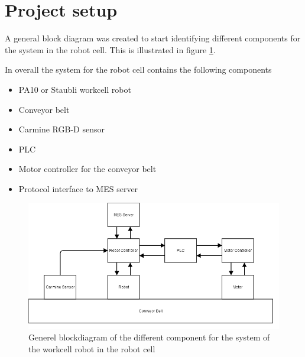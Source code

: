 \section{Project setup}
A general block diagram was created to start identifying different components for the system in the robot cell. This is illustrated in figure \ref{fig:hardwarediagram}. 

In overall the system for the robot cell contains the following components
\begin{itemize}
\item{PA10 or Staubli workcell robot}
\item{Conveyor belt}
\item{Carmine RGB-D sensor}
\item{PLC}
\item{Motor controller for the conveyor belt}
\item{Protocol interface to MES server}
\end{itemize}

\begin{figure}[ht]
\centering
\includegraphics[width=\textwidth]{images/hardwarediagram.png}
\caption{Generel blockdiagram of the different component for the system of the workcell robot in the robot cell}
\label{fig:hardwarediagram}
\end{figure}

